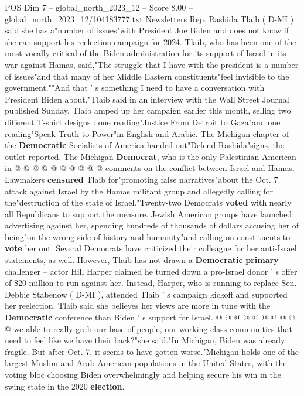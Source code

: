 \begin{textsample}{POS Dim 7 – global\_north\_2023\_12 – Score 8.00 – global\_north\_2023\_12/104183777.txt}  \label{ex:f7_pos_156}
Newsletters Rep.
Rashida Tlaib ( D-MI ) said she has a"number of issues"with President Joe Biden and does not know if she can support his reelection campaign for 2024.
Tlaib, who has been one of the most vocally critical of the Biden administration for its support of Israel in its war against Hamas, said,"The struggle that I have with the president is a number of issues"and that many of her Middle Eastern constituents"feel invisible to the government.""And that ' s something I need to have a conversation with President Biden about,"Tlaib said in an interview with the Wall Street Journal published Sunday.
Tlaib amped up her campaign earlier this month, selling two different T-shirt designs : one reading"Justice From Detroit to Gaza"and one reading"Speak Truth to Power"in English and Arabic.
The Michigan chapter of the \textbf{Democratic} Socialists of America handed out"Defend Rashida"signs, the outlet reported.
The Michigan \textbf{Democrat}, who is the only Palestinian American in @ @ @ @ @ @ @ @ @ @ comments on the conflict between Israel and Hamas.
Lawmakers \textbf{censured} Tlaib for"promoting false narratives"about the Oct. 7 attack against Israel by the Hamas militant group and allegedly calling for the"destruction of the state of Israel."Twenty-two Democrats \textbf{voted} with nearly all Republicans to support the measure.
Jewish American groups have launched advertising against her, spending hundreds of thousands of dollars accusing her of being"on the wrong side of history and humanity"and calling on constituents to \textbf{vote} her out.
Several Democrats have criticized their colleague for her anti-Israel statements, as well.
However, Tlaib has not drawn a \textbf{Democratic} \textbf{primary} challenger -- actor Hill Harper claimed he turned down a pro-Israel donor ' s offer of \$20 million to run against her.
Instead, Harper, who is running to replace Sen.
Debbie Stabenow ( D-MI ), attended Tlaib ' s campaign kickoff and supported her reelection.
Tlaib said she believes her views are more in tune with the \textbf{Democratic} conference than Biden ' s support for Israel. @ @ @ @ @ @ @ @ @ @ we able to really grab our base of people, our working-class communities that need to feel like we have their back?"she said."In Michigan, Biden was already fragile.
But after Oct. 7, it seems to have gotten worse."Michigan holds one of the largest Muslim and Arab American populations in the United States, with the voting bloc choosing Biden overwhelmingly and helping secure his win in the swing state in the 2020 \textbf{election}.

\end{textsample}
